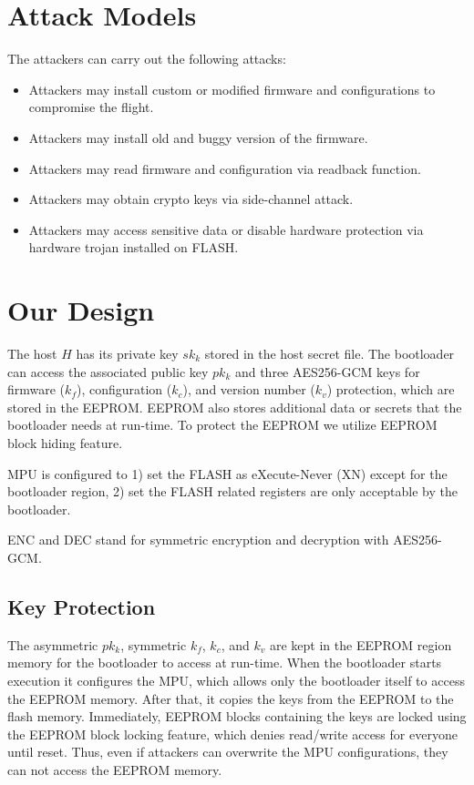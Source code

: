 \documentclass[11pt,oneside,onecolumn,letterpaper]{article}
\begin{document}
\section{Attack Models}

The attackers can carry out the following attacks:

\begin{itemize}
  \item Attackers may install custom or modified firmware and configurations to compromise the flight.
  \item Attackers may install old and buggy version of the firmware.
  \item Attackers may read firmware and configuration via readback function.
  \item Attackers may obtain crypto keys via side-channel attack.
  \item Attackers may access sensitive data or disable hardware protection via hardware trojan installed on FLASH.
\end{itemize}


\section{Our Design}

The host $H$ has its private key $sk_k$ stored in the host secret file.
The bootloader can access the associated public key $pk_k$ and three AES256-GCM keys for firmware ($k_f$), configuration ($k_c$), and version number ($k_v$) protection, which are stored in the EEPROM.
EEPROM also stores additional data or secrets that the bootloader needs at run-time.
To protect the EEPROM we utilize EEPROM block hiding feature.

MPU is configured to 1) set the FLASH as eXecute-Never (XN) except for the bootloader region, 2) set the FLASH related registers are only acceptable by the bootloader. 

ENC and DEC stand for symmetric encryption and decryption with AES256-GCM.

\subsection{Key Protection}
The asymmetric $pk_k$, symmetric $k_f$, $k_c$, and $k_v$ are kept in the EEPROM region memory for the bootloader to access at run-time.
When the bootloader starts execution it configures the MPU, which allows only the bootloader itself to access the EEPROM memory.
After that, it copies the keys from the EEPROM to the flash memory.
Immediately, EEPROM blocks containing the keys are locked using the EEPROM block locking feature, which denies read/write access for everyone until reset.
Thus, even if attackers can overwrite the MPU configurations, they can not access the EEPROM memory.
\end{document}
